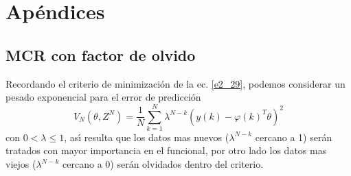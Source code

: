 \renewcommand{\thesection}{A.\arabic{section}}
\renewcommand{\theequation}{a.\arabic{equation}}
\renewcommand{\thefigure}{A.\arabic{figure}}

\chapter{Ap{\'e}ndices}
\section{MCR con factor de olvido}\label{A_1}
Recordando el criterio de minimizaci{\'o}n de la ec. \ref{e2_29}, podemos considerar un pesado exponencial para
el error de predicci{\'o}n
\begin{equation}
  V_N\left(\theta,Z^N\right)=\frac{1}{N}\sum_{k=1}^{N}\lambda^{N-k}\left(y(k)-\varphi(k)^T\theta\right)^2
\end{equation}
con $0<\lambda\leq1$, as{\'\i} resulta que los datos mas nuevos ($\lambda^{N-k}$ cercano a 1) ser{\'a}n tratados con
mayor importancia en el funcional, por otro lado los datos mas viejos ($\lambda^{N-k}$ cercano a 0) ser{\'a}n
olvidados dentro del criterio.

